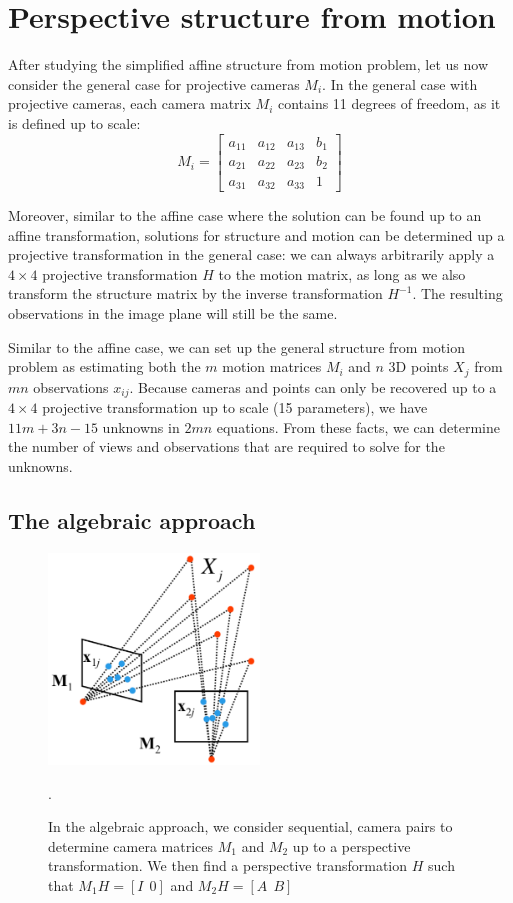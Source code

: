 \documentclass[a4paper, 12pt]{article}
\numberwithin{equation}{section}
\begin{document}
\section{Perspective structure from motion}
After studying the simplified affine structure from motion problem, let us now consider the general case for projective cameras $M_i$. In the general case with projective cameras, each camera matrix $M_i$ contains 11 degrees of freedom, as it is defined up to scale:
\begin{equation}
M_i=
\begin{bmatrix}
    a_{11}       & a_{12} & a_{13} &  b_{1} \\
    a_{21}       & a_{22} & a_{23} &  b_{2} \\
    a_{31}       & a_{32} & a_{33} &  1
\end{bmatrix}
\end{equation}

Moreover, similar to the affine case where the solution can be found up to an affine transformation, solutions for structure and motion can be determined up a projective transformation in the general case: we can always arbitrarily apply a $4\times 4$ projective transformation $H$ to the motion matrix, as long as we also transform the structure matrix by the inverse transformation $H^{-1}$. The resulting observations in the image plane will still be the same.

Similar to the affine case, we can set up the general structure from motion problem as estimating both the $m$ motion matrices $M_i$ and $n$ 3D points $X_j$ from $mn$ observations $x_{ij}$. Because cameras and points can only be recovered up to a $4\times 4$ projective transformation up to scale (15 parameters), we have $11m+3n-15$ unknowns in $2mn$ equations. From these facts, we can determine the number of views and observations that are required to solve for the unknowns. 

\subsection{The algebraic approach}

\begin{figure}[h!]
\centering
\includegraphics[width=0.5\textwidth]{figures/algebraic_setup.png}
\caption{In the algebraic approach, we consider sequential, camera pairs to determine camera matrices $M_1$ and $M_2$ up to a perspective transformation. We then find a perspective transformation $H$ such that $M_1H = [I~~0]$ and $M_2H = [A~~B]$}.
\label{fig:algebraic_setup}
\end{figure}
\end{document}
